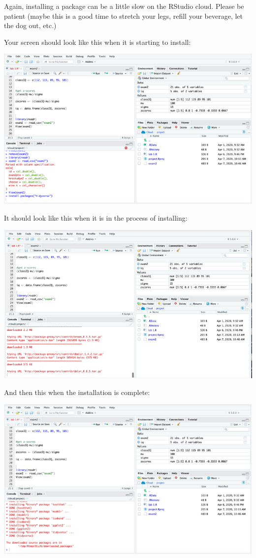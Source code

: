 \documentclass[
]{book}
\begin{document}
Again, installing a package can be a little slow on the RStudio cloud. Please be patient (maybe this is a good time to stretch your legs, refill your beverage, let the dog out, etc.)

Your screen should look like this when it is starting to install:

\includegraphics{img/instload1.png}

It should look like this when it is in the process of installing:

\includegraphics{img/instload2.png}

And then this when the installation is complete:

\includegraphics{img/instload3.png}
\end{document}
